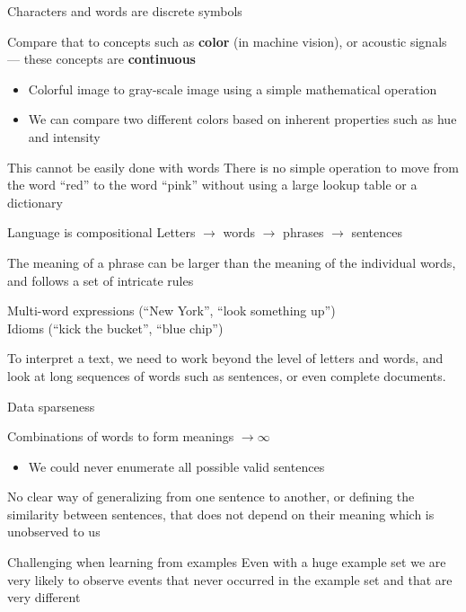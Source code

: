 \documentclass[12pt,aspectratio=169,handout]{beamer}
\begin{document}
\begin{frame}{Characters and words are discrete symbols}
	
	Compare that to concepts such as \textbf{color} (in machine vision), or acoustic
	signals --- these concepts are \textbf{continuous}
	
	\begin{itemize}
		\item Colorful image to gray-scale image using a simple mathematical operation
		\item We can compare two different colors based on inherent properties such as hue and intensity
	\end{itemize}
	
	\begin{block}{This cannot be easily done with words}
		There is no simple operation to move from the word ``red'' to the word ``pink'' without using a large lookup table or a dictionary
	\end{block}
	
\end{frame}


\begin{frame}{Language is compositional}
	Letters $\to$ words $\to$ phrases $\to$ sentences
	
	The meaning of a phrase can be larger than the meaning of the individual words,	and follows a set of intricate rules
	
	\begin{example}
		Multi-word expressions (``New York'', ``look something up'') \\
		Idioms (``kick the bucket'', ``blue chip'')
	\end{example}
	
	To interpret a text, we need to work beyond the level of letters and words, and look at long sequences of words such as sentences, or even complete documents.
\end{frame}


\begin{frame}{Data sparseness}
	
	Combinations of words to form meanings $\to \infty$
	
	\begin{itemize}
		\item We could never enumerate all possible valid sentences
	\end{itemize}
	
	
	No clear way of generalizing from one sentence to another, or defining the similarity between sentences, that does not depend on their meaning which is unobserved to us
	
	
	\begin{block}{Challenging when learning from examples}
		Even with a huge example set we are very likely to observe events that never occurred in the example set and that are very different
	\end{block}
	
\end{frame}
\end{document}
